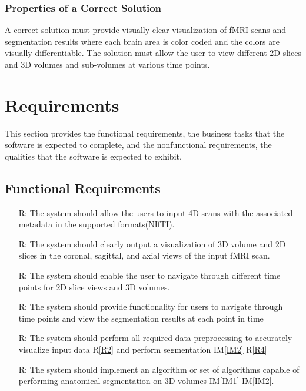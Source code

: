 \documentclass[12pt]{article}
\newcommand{\iref}[1]{IM\ref{#1}}
\newcounter{reqnum} %
\newcommand{\rref}[1]{R\ref{#1}}
\begin{document}
\subsubsection{Properties of a Correct Solution} \label{sec_CorrectSolution}

\noindent
A correct solution must provide visually clear visualization of fMRI scans and segmentation results
where each brain area is color coded and the colors are visually differentiable. The solution must allow
the user to view different 2D slices and 3D volumes and sub-volumes at various time points.

\section{Requirements}

This section provides the functional requirements, the business tasks that the
software is expected to complete, and the nonfunctional requirements, the
qualities that the software is expected to exhibit.

\subsection{Functional Requirements}

\noindent \begin{itemize}

  \item[R\refstepcounter{reqnum}\thereqnum \label{R1}:] The system should allow the users
        to input 4D scans with the associated metadata in the supported formats(NIfTI).

  \item[R\refstepcounter{reqnum}\thereqnum \label{R2}:] The system should clearly
        output a visualization of 3D volume and 2D slices in the coronal, sagittal, and axial views
        of the input fMRI scan.

  \item[R\refstepcounter{reqnum}\thereqnum \label{R3}:]The system should enable the user
        to navigate through different time points for 2D slice views and 3D volumes.

  \item[R\refstepcounter{reqnum}\thereqnum \label{R4}:]The system should provide functionality for
        users to navigate through time points and view the segmentation results at each point in time

  \item[R\refstepcounter{reqnum}\thereqnum \label{R5}:] The system should perform all required data preprocessing
        to accurately visualize input data R\ref*{R2} and perform segmentation \iref{IM2} \rref{R4}

  \item[R\refstepcounter{reqnum}\thereqnum \label{R6}:] The system should implement an algorithm or
        set of algorithms capable of performing anatomical segmentation on 3D volumes \iref{IM1} \iref{IM2}.


\end{itemize}
\end{document}
